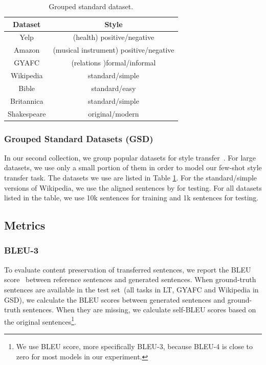 \begin{table}[th]\footnotesize
	\centering
	\begin{tabular}{cc}
		\hline
		\textbf{Dataset} & \textbf{Style} \\
		\hline
		Yelp & (health) positive/negative \\
		Amazon & (musical instrument) positive/negative \\
		GYAFC & (relations )formal/informal \\
		Wikipedia & standard/simple \\
		Bible & standard/easy \\
		Britannica & standard/simple \\
		Shakespeare & original/modern \\
		\hline
	\end{tabular}
	\caption{Grouped standard dataset.}\label{tb:data2}
\end{table}
\subsubsection*{Grouped Standard Datasets (GSD)}

In our second collection, we group popular datasets for style transfer~\citep{li2018delete,Sudhakar2020,rao-tetreault-2018-dear}. For large datasets, we use only a small portion of them in order to model our few-shot style transfer task. The datasets we use are listed in Table \ref{tb:data2}. For the standard/simple versions of Wikipedia, we use the aligned sentences by \citet{hwang2015aligning} for testing. For all datasets listed in the table, we use 10k sentences for training and 1k sentences for testing.


\subsection{Metrics}
\subsubsection*{BLEU-3}

To evaluate content preservation of transferred sentences, we report the BLEU score~\citep{papineni2002bleu} between reference sentences and generated sentences. When ground-truth sentences are available in the test set~(all tasks in LT, GYAFC and Wikipedia in GSD), we calculate the BLEU scores between generated sentences and ground-truth sentences. When they are missing, we calculate self-BLEU scores based on the original sentences\footnote{We use BLEU score, more specifically BLEU-3, because BLEU-4 is close to zero for most models in our experiment.}.

